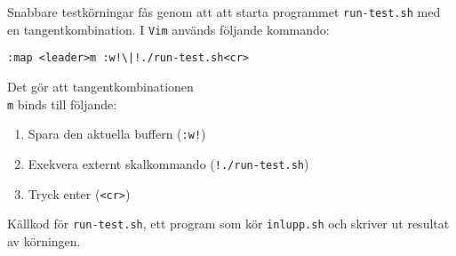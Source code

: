 Snabbare testkörningar fås genom att att starta programmet \texttt{run-test.sh}
med en tangentkombination. I \texttt{Vim} används följande kommando:

\begin{verbatim}
:map <leader>m :w!\|!./run-test.sh<cr>
\end{verbatim}

Det gör att tangentkombinationen \texttt{\\ m} binds till följande:
\begin{enumerate} 
  \item Spara den aktuella buffern (\texttt{:w!}) 
  \item Exekvera externt skalkommando (\texttt{!./run-test.sh})
  \item Tryck enter (\texttt{<cr>})
\end{enumerate} 

\begin{listing}[H]
\caption{Källkod för \texttt{run-test.sh}, ett program som kör
         \texttt{inlupp.sh} och skriver ut resultat av körningen.}
\label{listing:run-test}
\end{listing}
